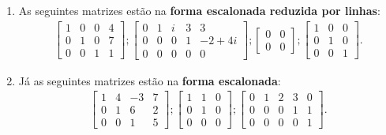 \begin{exemplos}
    \begin{enumerate}[label={\arabic*})]
        \item As seguintes matrizes estão na \textbf{forma escalonada reduzida por linhas}:
            \begin{align*}
                \begin{bmatrix}
                    1 & 0 & 0 & 4\\
                    0 & 1 & 0 & 7\\
                    0 & 0 & 1 & 1
                \end{bmatrix};
                \begin{bmatrix}
                    0 & 1 & i & 3 & 3\\
                    0 & 0 & 0 & 1 & -2 + 4i\\
                    0 & 0 & 0 & 0 & 0
                \end{bmatrix};
                \begin{bmatrix}
                    0 & 0\\
                    0 & 0
                \end{bmatrix};
                \begin{bmatrix}
                    1 & 0 & 0\\
                    0 & 1 & 0\\
                    0 & 0 & 1
                \end{bmatrix}.
            \end{align*}

        \item Já as seguintes matrizes estão na \textbf{forma escalonada}:
            \begin{align*}
                \begin{bmatrix}
                    1 & 4 & -3 & 7\\
                    0 & 1 & 6 & 2\\
                    0 & 0 & 1 & 5
                \end{bmatrix};
                \begin{bmatrix}
                    1 & 1 & 0\\
                    0 & 1 & 0\\
                    0 & 0 & 0
                \end{bmatrix};
                \begin{bmatrix}
                    0 & 1 & 2 & 3 & 0\\
                    0 & 0 & 0 & 1 & 1\\
                    0 & 0 & 0 & 0 & 1
                \end{bmatrix}.
            \end{align*}
    \end{enumerate}
\end{exemplos}
